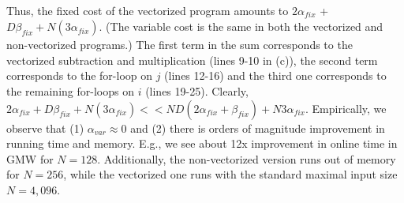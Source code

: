 Thus, the fixed cost of the vectorized program amounts to
$2\alpha_\mathit{fix}$ + $D \beta_\mathit{fix} + N(3\alpha_\mathit{fix})$. (The variable cost is the same in both the vectorized and non-vectorized programs.)
The first term in the sum corresponds to the vectorized
subtraction and multiplication (lines 9-10 in (c)), the second term corresponds to the for-loop on $j$ (lines 12-16) and the third
one corresponds to the remaining for-loops on $i$ (lines 19-25). 
Clearly, $2\alpha_\mathit{fix} + D\beta_\mathit{fix} + N(3\alpha_\mathit{fix}) << ND(2\alpha_\mathit{fix}+\beta_\mathit{fix}) + N3\alpha_\mathit{fix}$.
Empirically, we observe that (1) $\alpha_\mathit{var} \approx 0$ and (2) there is orders of magnitude improvement in running time and memory. 
E.g., we see about 12x improvement in online time in GMW for $N=128$. Additionally, the non-vectorized version runs out of memory for $N=256$, 
while the vectorized one runs with the standard maximal input size $N=4,096$.

